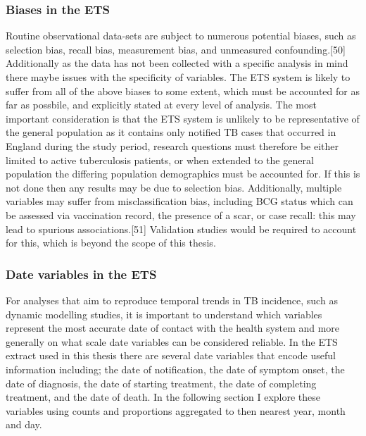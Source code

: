 \documentclass[11pt,twoside]{bristolthesis}
\begin{document}
  \hypertarget{biases-in-the-ets}{%
  \subsubsection{Biases in the ETS}\label{biases-in-the-ets}}
  
  Routine observational data-sets are subject to numerous potential biases, such as selection bias, recall bias, measurement bias, and unmeasured confounding.{[}50{]} Additionally as the data has not been collected with a specific analysis in mind there maybe issues with the specificity of variables. The ETS system is likely to suffer from all of the above biases to some extent, which must be accounted for as far as possbile, and explicitly stated at every level of analysis. The most important consideration is that the ETS system is unlikely to be representative of the general population as it contains only notified TB cases that occurred in England during the study period, research questions must therefore be either limited to active tuberculosis patients, or when extended to the general population the differing population demographics must be accounted for. If this is not done then any results may be due to selection bias. Additionally, multiple variables may suffer from misclassification bias, including BCG status which can be assessed via vaccination record, the presence of a scar, or case recall: this may lead to spurious associations.{[}51{]} Validation studies would be required to account for this, which is beyond the scope of this thesis.
  
  \hypertarget{date-variables-in-the-ets}{%
  \subsubsection{Date variables in the ETS}\label{date-variables-in-the-ets}}
  
  For analyses that aim to reproduce temporal trends in TB incidence, such as dynamic modelling studies, it is important to understand which variables represent the most accurate date of contact with the health system and more generally on what scale date variables can be considered reliable. In the ETS extract used in this thesis there are several date variables that encode useful information including; the date of notification, the date of symptom onset, the date of diagnosis, the date of starting treatment, the date of completing treatment, and the date of death. In the following section I explore these variables using counts and proportions aggregated to then nearest year, month and day.
  
\end{document}

